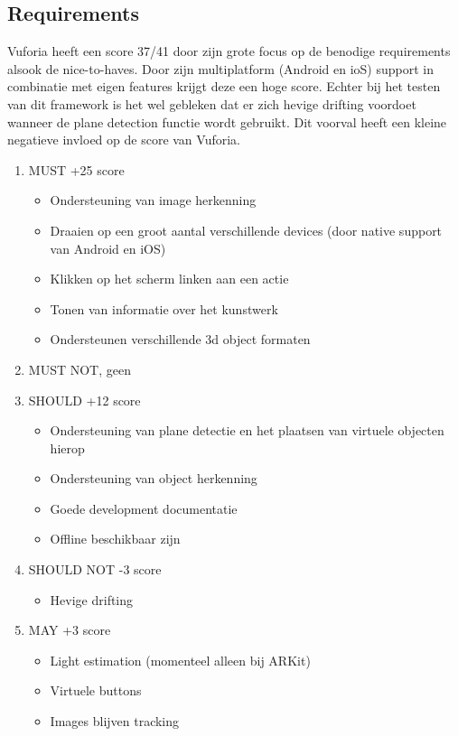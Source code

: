 \subsection{Requirements}
Vuforia heeft een score 37/41 door zijn grote focus op de benodige requirements alsook de nice-to-haves. Door zijn multiplatform (Android en ioS) support in combinatie met eigen features krijgt deze een hoge score. Echter bij het testen van dit framework is het wel gebleken dat er zich hevige drifting voordoet wanneer de plane detection functie wordt gebruikt. Dit voorval heeft een kleine negatieve invloed op de score van Vuforia.
\begin{enumerate}
    \item MUST +25 score
    \begin{itemize}
        \item Ondersteuning van image herkenning
        \item Draaien op een groot aantal verschillende devices (door native support van Android en iOS)
        \item Klikken op het scherm linken aan een actie 
        \item Tonen van informatie over het kunstwerk
        \item Ondersteunen verschillende 3d object formaten
    \end{itemize}
    \item MUST NOT, geen
    \item SHOULD +12 score
    \begin{itemize}
        \item Ondersteuning van plane detectie en het plaatsen van virtuele objecten hierop
        \item Ondersteuning van object herkenning
        \item Goede development documentatie
        \item Offline beschikbaar zijn
    \end{itemize}
    \item SHOULD NOT -3 score
    \begin{itemize}
        \item Hevige drifting
    \end{itemize}
    \item MAY +3 score
    \begin{itemize}
        \item Light estimation (momenteel alleen bij ARKit)
        \item Virtuele buttons
        \item Images blijven tracking
    \end{itemize}
\end{enumerate}

